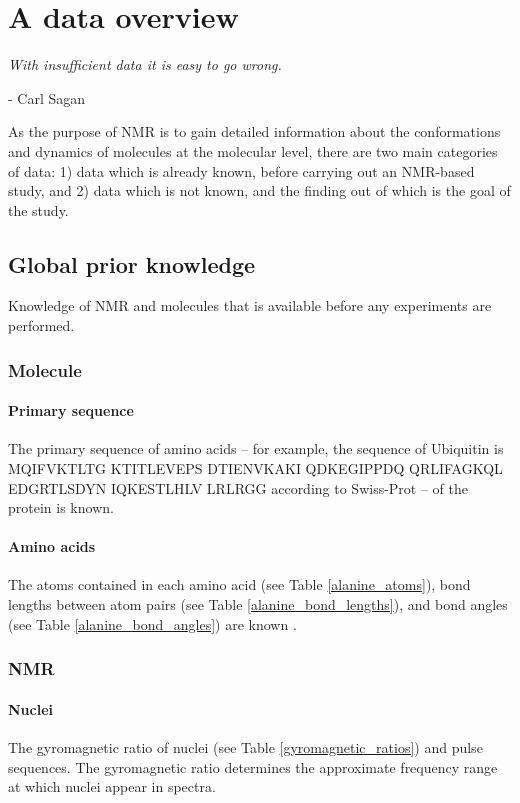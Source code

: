 \chapter{A data overview}

\begin{center}
  \textit{With insufficient data it is easy to go wrong.}

 - Carl Sagan
\end{center}

As the purpose of NMR is to gain detailed information about the conformations
and dynamics of molecules at the molecular level, there are two main categories
of data: 1) data which is already known, before carrying out an NMR-based 
study, and 2) data which is not known, and the finding out of which is the 
goal of the study.


\section{Global prior knowledge}
Knowledge of NMR and molecules that is available before any experiments are
performed.

\subsection{Molecule}

\subsubsection{Primary sequence}
The primary sequence of amino acids -- for example, the sequence of Ubiquitin
is MQIFVKTLTG KTITLEVEPS DTIENVKAKI QDKEGIPPDQ QRLIFAGKQL EDGRTLSDYN IQKESTLHLV LRLRGG
according to Swiss-Prot -- of the protein is known.  

\subsubsection{Amino acids}
The atoms contained in each amino acid (see Table \ref{alanine_atoms}), 
bond lengths between atom pairs (see Table \ref{alanine_bond_lengths}), 
and bond angles (see Table \ref{alanine_bond_angles}) are known 
\cite{alanine_sreepad}.

\subsection{NMR}

\subsubsection{Nuclei}
The gyromagnetic ratio of nuclei (see Table \ref{gyromagnetic_ratios}) and 
pulse sequences.  The gyromagnetic ratio determines the approximate 
frequency range at which nuclei appear in spectra.

